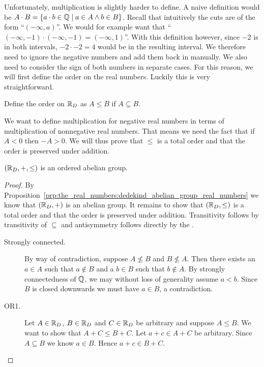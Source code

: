 \documentclass[../main.tex]{subfiles}
\begin{document}
Unfortunately, multiplication is slightly harder to define. A naive definition would be $A\cdot B=\{a\cdot b\in\mathbb{Q}\mid a\in A\land b\in B\}$. Recall that intuitively the cuts are of the form ``$(-\infty,a)$''. We would for example want that ``$(-\infty,-1)\cdot(-\infty,-1)=(-\infty,1)$''. With this definition however, since $-2$ is in both intervals, $-2\cdot-2=4$ would be in the resulting interval. We therefore need to ignore the negative numbers and add them back in manually. We also need to consider the sign of both numbers in separate cases. For this reason, we will first define the order on the real numbers. Luckily this is very straightforward.
\begin{definition}
    Define the order on $\mathbb{R}_D$ as $A\leq B$ if $A\subseteq B$.
\end{definition}
We want to define multiplication for negative real numbers in terms of multiplication of nonnegative real numbers. That means we need the fact that if $A<0$ then $-A>0$. We will thus prove that $\leq$ is a total order and that the order is preserved under addition.
\begin{proposition}\label{prp:the_real_numbers:dedekind_totally_ordered_abelian_group_real_numbers}
    $(\mathbb{R}_D,+,\leq)$ is an ordered abelian group.
\end{proposition}
\begin{proof}
    By Proposition~\ref{prp:the_real_numbers:dedekind_abelian_group_real_numbers} we know that $(\mathbb{R}_D,+)$ is an abelian group. It remains to show that $(\mathbb{R}_D,\leq)$ is a total order and that the order is preserved under addition. Transitivity follows by transitivity of $\subseteq$ and antisymmetry follows directly by the .
    \begin{description}
        \item[Strongly connected.] By way of contradiction, suppose $A\not\leq B$ and $B\not\leq A$. Then there exists an $a\in A$ such that $a\notin B$ and a $b\in B$ such that $b\notin A$. By strongly connectedness of $\mathbb{Q}$, we may without loss of generality assume $a<b$. Since $B$ is closed downwards we must have $a\in B$, a contradiction.
        \item[OR1.] Let $A\in\mathbb{R}_D$, $B\in\mathbb{R}_D$ and $C\in\mathbb{R}_D$ be arbitrary and suppose $A\leq B$. We want to show that $A+C\leq B+C$. Let $a+c\in A+C$ be arbitrary. Since $A\subseteq B$ we know $a\in B$. Hence $a+c\in B+C$.
    \end{description}
\end{proof}
\end{document}
